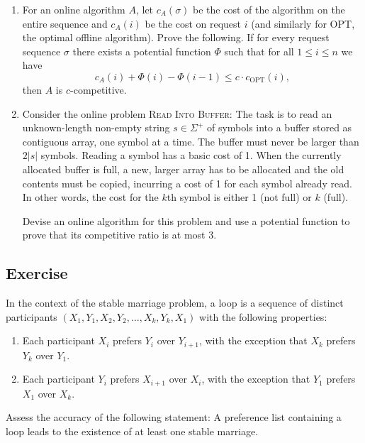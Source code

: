 \documentclass[14pt]{extreport}
\newcounter{counter}
\newcommand{\Exercise}{Exercise \stepcounter{counter}\thecounter}
\begin{document}
    \begin{enumerate}[label=(\alph*)]
        \item For an online algorithm $A$, let $c_A(\sigma)$ be the cost of the algorithm on the entire sequence and $c_A(i)$ be the cost on request $i$ (and similarly for $\text{OPT}$, the optimal offline algorithm). Prove the following. If for every request sequence $\sigma$ there exists a potential function $\Phi$ such that for all $1 \leq i \leq n$ we have
        $$
        c_A(i) + \Phi(i) - \Phi(i-1) \leq c \cdot c_{\text{OPT}}(i),
        $$ then $A$ is $c$-competitive.
        
        \item Consider the online problem \textsc{Read Into Buffer}: The task is to read an unknown-length non-empty string $s \in \Sigma^+$ of symbols into a buffer stored as contiguous array, one symbol at a time. The buffer must never be larger than $2|s|$ symbols. Reading a symbol has a basic cost of 1. When the currently allocated buffer is full, a new, larger array has to be allocated and the old contents must be copied, incurring a cost of 1 for each symbol already read. In other words, the cost for the $k$th symbol is either 1 (not full) or $k$ (full).
    
        \vspace{5mm}
        Devise an online algorithm for this problem and use a potential function to prove that its competitive ratio is at most 3.
    \end{enumerate}

\subsection*{\Exercise}
    In the context of the stable marriage problem, a loop is a sequence of distinct participants \( (X_1, Y_1, X_2, Y_2, \ldots, X_k, Y_k, X_1) \) with the following properties:
    \begin{enumerate}[label=\arabic*.]
        \item Each participant \( X_i \) prefers \( Y_i \) over \( Y_{i+1} \), with the exception that \( X_k \) prefers \( Y_k \) over \( Y_1 \).
        \item Each participant \( Y_i \) prefers \( X_{i+1} \) over \( X_i \), with the exception that \( Y_1 \) prefers \( X_1 \) over \( X_k \).
    \end{enumerate}
    Assess the accuracy of the following statement: A preference list containing a loop leads to the existence of at least one stable marriage.
\end{document}

